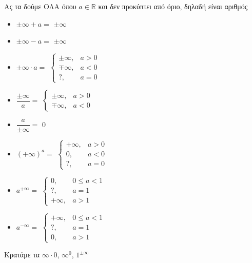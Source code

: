 \documentclass[greek]{beamer}
\begin{document}
\begin{frame}{Ας τα δούμε ΟΛΑ}
  όπου $a\in\mathbb{R}$ και δεν προκύπτει από όριο, δηλαδή είναι αριθμός
  \begin{multicols}{2}
    \begin{itemize}
      \item $\pm\infty + a=$ \pause $\pm\infty$ \pause
      \item $\pm\infty - a=$ \pause $\pm\infty$ \pause
      \item $\pm\infty \cdot a=$ \pause $\begin{cases} \pm\infty, & a>0 \\ \mp\infty, & a<0 \\ ?, & a=0\end{cases}$ \pause
      \item $\dfrac{\pm\infty}{a}=$ \pause $\begin{cases} \pm\infty, & a>0 \\ \mp\infty, & a<0\end{cases}$ \pause
      \item $\dfrac{a}{\pm\infty}=$ \pause $0$ \pause
      \item $(+\infty)^a=$ \pause $\begin{cases} +\infty, & a>0 \\ 0, & a<0 \\ ?, & a=0\end{cases}$ \pause
      \item $a^{+\infty}=$ \pause $\begin{cases} 0, & 0\le a <1 \\ ?, & a=1 \\ +\infty, & a>1\end{cases}$ \pause
      \item $a^{-\infty}=$ \pause $\begin{cases} +\infty, & 0\le a <1 \\ ?, & a=1 \\ 0, & a>1\end{cases}$ \pause
    \end{itemize}
  \end{multicols}
  Κρατάμε τα $\infty\cdot 0$, $\infty^0$, $1^{\pm\infty}$
\end{frame}
\end{document}
